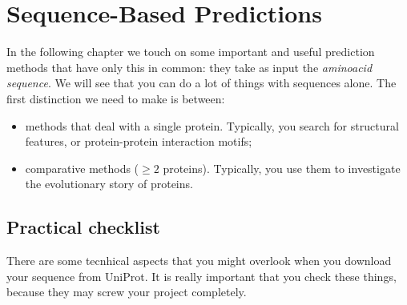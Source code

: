 \chapter{Sequence-Based Predictions}
In the following chapter we touch on some important and useful prediction methods that
have only this in common: they take as input the \textit{aminoacid sequence}. We will see
that you can do a lot of things with sequences alone. 
The first distinction we need to make is between:
\begin{itemize}
    \item methods that deal with a single protein. Typically, you search for
    structural features, or protein-protein interaction motifs;
    \item comparative methods ($\geq 2$ proteins). Typically, you use them to investigate the
    evolutionary story of proteins.
\end{itemize}

\section{Practical checklist}
There are some tecnhical aspects that you might overlook when you download your sequence from UniProt. 
It is really important that you check these things, because they may screw your project completely.

